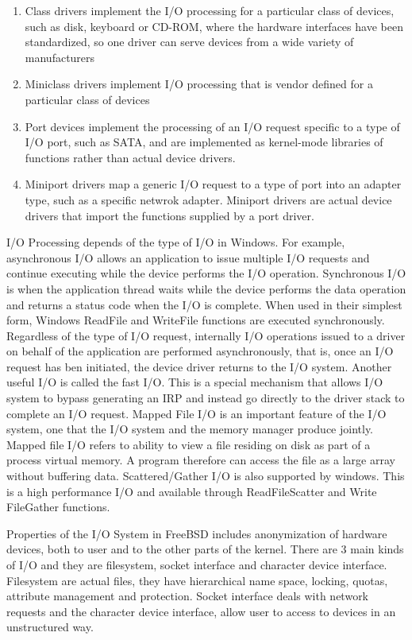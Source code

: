 \documentclass[letterpaper,10pt,draftclsnofoot,onecolumn]{IEEEtran}
\begin{document}
\begin{enumerate}
\item Class drivers implement the I/O processing for a particular class of devices, such as disk, keyboard or CD-ROM, where the hardware interfaces have been standardized, so one driver can serve devices from a wide variety of manufacturers
\item Miniclass drivers implement I/O processing that is vendor defined for a particular class of devices
\item Port devices implement the processing of an I/O request specific to a type of I/O port, such as SATA, and are implemented as kernel-mode libraries of functions rather than actual device drivers.
\item Miniport drivers map a generic I/O request to a type of port into an adapter type, such as a specific netwrok adapter. Miniport drivers are actual device drivers that import the functions supplied by a port driver.
\end{enumerate}
I/O Processing depends of the type of I/O in Windows. For example, asynchronous I/O allows an application to issue multiple I/O requests and continue executing while the device performs the I/O operation. Synchronous I/O is when the application thread waits while the device performs the data operation and returns a status code when the I/O is complete. When used in their simplest form, Windows ReadFile and WriteFile functions are executed synchronously. Regardless of the type of I/O request, internally I/O operations issued to a driver on behalf of the application are performed asynchronously, that is, once an I/O request has ben initiated, the device driver returns to the I/O system.
Another useful I/O is called the fast I/O. This is a special mechanism that allows I/O system to bypass generating an IRP and instead go directly to the driver stack to complete an I/O request. Mapped File I/O is an important feature of the I/O system, one that the I/O system and the memory manager produce jointly. Mapped file I/O refers to ability to view a file residing on disk as part of a process virtual memory. A program therefore can access the file as a large array without buffering data. Scattered/Gather I/O is also supported by windows. This is a high performance I/O and available through ReadFileScatter and Write FileGather functions.


Properties of the I/O System in FreeBSD includes anonymization of hardware devices, both to user and to the other parts of the kernel. 
There are 3 main kinds of I/O and they are filesystem, socket interface and character device interface. Filesystem are actual files, they have hierarchical name space, locking, quotas, attribute management and protection. Socket interface deals with network requests and the character device interface, allow user to access to devices in an unstructured way.
\end{document}
